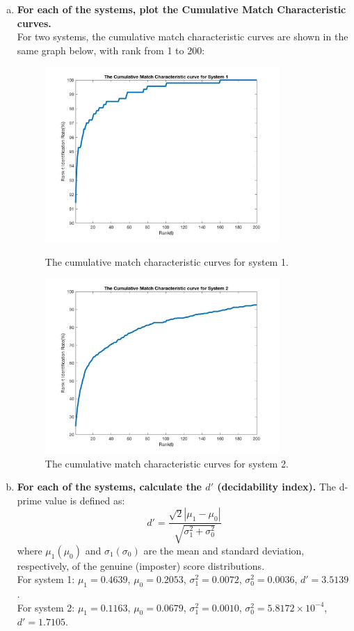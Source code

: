 \documentclass[a4paper]{article}
\begin{document}
\begin{spacing}{2.0}
\begin{enumerate}[(a)]
		\item \textbf{For each of the systems, plot the Cumulative Match Characteristic curves.}\\
		For two systems, the cumulative match characteristic curves are shown in the same graph below, 		with rank from 1 to 200:
		\begin{figure}[h]
		\begin{minipage}[t]{0.5\linewidth}
		\centering
		\includegraphics[width = 3.5in]{CMC1.jpg}
		\caption{The cumulative match characteristic curves for system 1.}
		\end{minipage}
		\begin{minipage}[t]{0.5\linewidth}
		\centering
		\includegraphics[width = 3.5in]{CMC2.jpg}
		\caption{The cumulative match characteristic curves for system 2.}
		\end{minipage}
		\end{figure}
		
		\item \textbf{For each of the systems, calculate the $d'$ (decidability index).}
		The d-prime value is defined as:
		$$d' = \displaystyle\frac{\sqrt{2}|\mu_1-\mu_0|}{\sqrt{\sigma_1^2+\sigma_0^2}}$$
		where $\mu_1(\mu_0)$ and $\sigma_1(\sigma_0)$ are the mean and standard deviation, 				respectively, of the genuine (imposter) score distributions.\\
		For system 1: $\mu_1 = 0.4639$, $\mu_0 = 0.2053$, $\sigma_1^2 = 0.0072$, $\sigma_0^2 = 			0.0036$, $d' = 3.5139$.\\
		For system 2: $\mu_1 = 0.1163$, $\mu_0 = 0.0679$,  $\sigma_1^2 = 0.0010$, $\sigma_0^2 = 			5.8172 \times 10^{-4}$, $d' = 1.7105$.
		

\end{enumerate}
\end{spacing}
\end{document}
